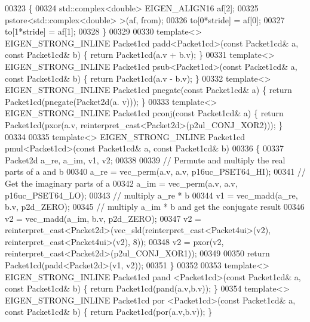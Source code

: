 \begin{DoxyCode}
00323 \{
00324   std::complex<double> EIGEN\_ALIGN16 af[2];
00325   pstore<std::complex<double> >(af, from);
00326   to[0*stride] = af[0];
00327   to[1*stride] = af[1];
00328 \}
00329 
00330 \textcolor{keyword}{template}<> EIGEN\_STRONG\_INLINE Packet1cd padd<Packet1cd>(\textcolor{keyword}{const} Packet1cd& a, \textcolor{keyword}{const} Packet1cd& b) \{ \textcolor{keywordflow}{return} 
      Packet1cd(a.v + b.v); \}
00331 \textcolor{keyword}{template}<> EIGEN\_STRONG\_INLINE Packet1cd psub<Packet1cd>(\textcolor{keyword}{const} Packet1cd& a, \textcolor{keyword}{const} Packet1cd& b) \{ \textcolor{keywordflow}{return} 
      Packet1cd(a.v - b.v); \}
00332 \textcolor{keyword}{template}<> EIGEN\_STRONG\_INLINE Packet1cd pnegate(\textcolor{keyword}{const} Packet1cd& a) \{ \textcolor{keywordflow}{return} Packet1cd(pnegate(Packet2d(a.
      v))); \}
00333 \textcolor{keyword}{template}<> EIGEN\_STRONG\_INLINE Packet1cd pconj(\textcolor{keyword}{const} Packet1cd& a) \{ \textcolor{keywordflow}{return} Packet1cd(pxor(a.v, 
      reinterpret\_cast<Packet2d>(p2ul\_CONJ\_XOR2))); \}
00334 
00335 \textcolor{keyword}{template}<> EIGEN\_STRONG\_INLINE Packet1cd pmul<Packet1cd>(\textcolor{keyword}{const} Packet1cd& a, \textcolor{keyword}{const} Packet1cd& b)
00336 \{
00337   Packet2d a\_re, a\_im, v1, v2;
00338 
00339   \textcolor{comment}{// Permute and multiply the real parts of a and b}
00340   a\_re = vec\_perm(a.v, a.v, p16uc\_PSET64\_HI);
00341   \textcolor{comment}{// Get the imaginary parts of a}
00342   a\_im = vec\_perm(a.v, a.v, p16uc\_PSET64\_LO);
00343   \textcolor{comment}{// multiply a\_re * b}
00344   v1 = vec\_madd(a\_re, b.v, p2d\_ZERO);
00345   \textcolor{comment}{// multiply a\_im * b and get the conjugate result}
00346   v2 = vec\_madd(a\_im, b.v, p2d\_ZERO);
00347   v2 = \textcolor{keyword}{reinterpret\_cast<}Packet2d\textcolor{keyword}{>}(vec\_sld(reinterpret\_cast<Packet4ui>(v2), reinterpret\_cast<Packet4ui>(v2),
       8));
00348   v2 = pxor(v2, reinterpret\_cast<Packet2d>(p2ul\_CONJ\_XOR1));
00349 
00350   \textcolor{keywordflow}{return} Packet1cd(padd<Packet2d>(v1, v2));
00351 \}
00352 
00353 \textcolor{keyword}{template}<> EIGEN\_STRONG\_INLINE Packet1cd pand   <Packet1cd>(\textcolor{keyword}{const} Packet1cd& a, \textcolor{keyword}{const} Packet1cd& b) \{ \textcolor{keywordflow}{
      return} Packet1cd(pand(a.v,b.v)); \}
00354 \textcolor{keyword}{template}<> EIGEN\_STRONG\_INLINE Packet1cd por    <Packet1cd>(\textcolor{keyword}{const} Packet1cd& a, \textcolor{keyword}{const} Packet1cd& b) \{ \textcolor{keywordflow}{
      return} Packet1cd(por(a.v,b.v)); \}

\end{DoxyCode}
